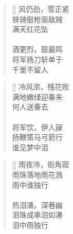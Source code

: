 \renewcommand{\poemtoc}{section}
\settowidth{\versewidth}{风仍劲, 雪正紧}
\begin{verse}[\versewidth]
风仍劲，雪正紧\\
铁骑挺枪驱敌贼\\
满天红花坠\\
~\\
酒更烈，鼓最鸣\\
将军扬刀斩单于\\
千里不留人
\end{verse}

\renewcommand{\poemtoc}{section}
\settowidth{\versewidth}{风仍劲, 雪正紧}
\begin{verse}[\versewidth]
冷风浓，残花败\\
满地嫩绿迎春来\\
何人送春去\\
~\\
将军饮，伊人寐\\
扬鞭策马弓箭行\\
谁见梦中泪
\end{verse}

\renewcommand{\poemtoc}{section}
\settowidth{\versewidth}{风仍劲, 雪正紧}
\begin{verse}[\versewidth]
雨夜冷，街角寂\\
雨珠落地雨花溅\\
雨中谁独行\\
~\\
热泪涌，深巷幽\\
泪珠成串泪如瀑\\
泪中雨独行
\end{verse}
